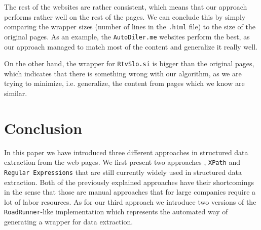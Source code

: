 \documentclass{article}
\begin{document}
	The rest of the websites are rather consistent, which means that our approach performs rather well on the rest of the pages. We can conclude this by simply comparing the wrapper sizes (number of lines in the \texttt{.html} file) to the size of the original pages. As an example, the \texttt{AutoDiler.me} websites perform the best, as our approach managed to match most of the content and generalize it really well.
	
	On the other hand, the wrapper for \texttt{RtvSlo.si} is bigger than the original pages, which indicates that there is something wrong with our algorithm, as we are trying to minimize, i.e. generalize, the content from pages which we know are similar.
	
	\section{Conclusion}
	In this paper we have introduced three different approaches in structured data extraction from the web pages. We first present two approaches , \texttt{XPath} and \texttt{Regular Expressions} that are still currently widely used in structured data extraction. Both of the previously explained approaches have their shortcomings in the sense that those are manual approaches that for large companies require a lot of labor resources. As for our third approach we introduce two versions of the \texttt{RoadRunner}-like implementation which represents the automated way of generating a wrapper for data extraction.
	
	
	
	
	
\end{document}
